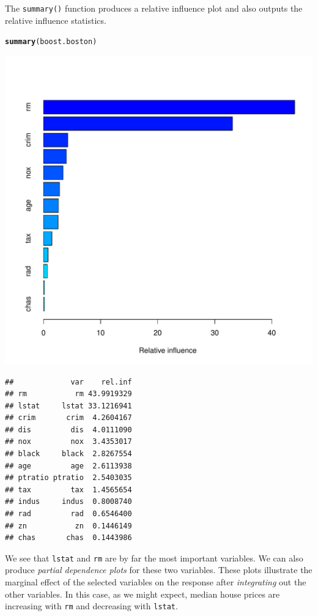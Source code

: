 \documentclass[12pt]{article}\usepackage[]{graphicx}\usepackage[]{color}
\makeatletter
\def\maxwidth{ %
  \ifdim\Gin@nat@width>\linewidth
    \linewidth
  \else
    \Gin@nat@width
  \fi
}
\newcommand{\hlstd}[1]{\textcolor[rgb]{0.345,0.345,0.345}{#1}}%
\newcommand{\hlkwd}[1]{\textcolor[rgb]{0.737,0.353,0.396}{\textbf{#1}}}%
\newenvironment{kframe}{%
 \def\at@end@of@kframe{}%
 \ifinner\ifhmode%
  \def\at@end@of@kframe{\end{minipage}}%
  \begin{minipage}{\columnwidth}%
 \fi\fi%
 \def\FrameCommand##1{\hskip\@totalleftmargin \hskip-\fboxsep
 \colorbox{shadecolor}{##1}\hskip-\fboxsep
     \hskip-\linewidth \hskip-\@totalleftmargin \hskip\columnwidth}%
 \MakeFramed {\advance\hsize-\width
   \@totalleftmargin\z@ \linewidth\hsize
   \@setminipage}}%
 {\par\unskip\endMakeFramed%
 \at@end@of@kframe}
\newenvironment{knitrout}{}{} %
\makeatother
\begin{document}
The \texttt{summary()} function produces a relative influence plot and also outputs the relative influence statistics.

\begin{knitrout}
\color{fgcolor}\begin{kframe}
\begin{alltt}
\hlkwd{summary}\hlstd{(boost.boston)}
\end{alltt}
\end{kframe}
\includegraphics[width=\maxwidth]{figure/unnamed-chunk-25-1} 
\begin{kframe}\begin{verbatim}
##             var    rel.inf
## rm           rm 43.9919329
## lstat     lstat 33.1216941
## crim       crim  4.2604167
## dis         dis  4.0111090
## nox         nox  3.4353017
## black     black  2.8267554
## age         age  2.6113938
## ptratio ptratio  2.5403035
## tax         tax  1.4565654
## indus     indus  0.8008740
## rad         rad  0.6546400
## zn           zn  0.1446149
## chas       chas  0.1443986
\end{verbatim}
\end{kframe}
\end{knitrout}

We see that \texttt{lstat} and \texttt{rm} are by far the most important variables. We can also produce \textit{partial dependence plots} for these two variables. These plots illustrate the marginal effect of the selected variables on the response after \textit{integrating} out the other variables. In this case, as we might expect, median house prices are increasing with \texttt{rm} and decreasing with \texttt{lstat}.
\end{document}
